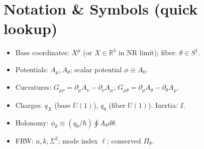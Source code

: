 \section{Notation \& Symbols (quick lookup)}\label{sec:notation}
\begin{itemize}
  \item Base coordinates: $X^\mu$ (or $X\in\mathbb R^3$ in NR limit); fiber: $\theta\in S^1$.
  \item Potentials: $A_\mu, A_\theta$; scalar potential $\phi\equiv A_0$.
  \item Curvatures: $G_{\mu\nu}=\partial_\mu A_\nu-\partial_\nu A_\mu$, $G_{\mu\theta}=\partial_\mu A_\theta-\partial_\theta A_\mu$.
  \item Charges: $q_X$ (base $U(1)$), $q_\theta$ (fiber $U(1)$). Inertia: $I$.
  \item Holonomy: $\phi_\theta\equiv( q_\theta/\hbar)\oint A_\theta d\theta$.
  \item FRW: $a,k,\Sigma^2$; mode index $\ell$; conserved $\Pi_\theta$.
\end{itemize}
